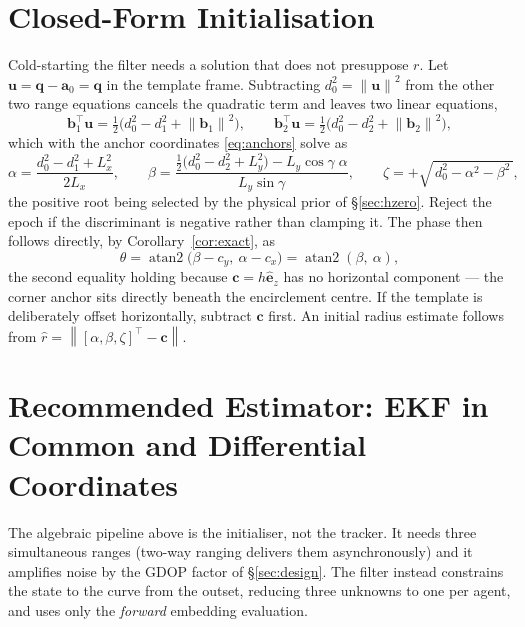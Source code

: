 \documentclass[11pt,a4paper]{article}
\newcommand{\ez}{\hat{\bm{e}}_z}
\newcommand{\q}{\bm{q}}
\newcommand{\av}{\bm{a}}
\newcommand{\bv}{\bm{b}}
\newcommand{\uv}{\bm{u}}
\newcommand{\cv}{\bm{c}}
\newcommand{\norm}[1]{\left\lVert#1\right\rVert}
\begin{document}
\section{Closed-Form Initialisation}
\label{sec:init}

Cold-starting the filter needs a solution that does not presuppose $r$. Let
$\uv = \q - \av_0 = \q$ in the template frame. Subtracting
$d_0^2 = \norm{\uv}^2$ from the other two range equations cancels the quadratic
term and leaves two linear equations,
\begin{equation}
\bv_1^\top\uv = \tfrac{1}{2}\big(d_0^2 - d_1^2 + \norm{\bv_1}^2\big),
\qquad
\bv_2^\top\uv = \tfrac{1}{2}\big(d_0^2 - d_2^2 + \norm{\bv_2}^2\big),
\end{equation}
which with the anchor coordinates \eqref{eq:anchors} solve as
\begin{equation}
\alpha = \frac{d_0^2 - d_1^2 + L_x^2}{2L_x},
\qquad
\beta = \frac{\tfrac{1}{2}\big(d_0^2-d_2^2+L_y^2\big) - L_y\cos\gamma\;\alpha}{L_y\sin\gamma},
\qquad
\zeta = +\sqrt{\,d_0^2 - \alpha^2 - \beta^2\,},
\label{eq:trilat}
\end{equation}
the positive root being selected by the physical prior of
\S\ref{sec:hzero}. Reject the epoch if the discriminant is negative rather than
clamping it. The phase then follows directly, by Corollary~\ref{cor:exact}, as
\begin{equation}
\theta = \operatorname{atan2}\big(\beta - c_y,\ \alpha - c_x\big)
       = \operatorname{atan2}(\beta,\ \alpha),
\end{equation}
the second equality holding because $\cv = h\ez$ has no horizontal component ---
the corner anchor sits directly beneath the encirclement centre. If the template
is deliberately offset horizontally, subtract $\cv$ first. An initial radius
estimate follows from $\hat r = \norm{[\alpha,\beta,\zeta]^\top - \cv}$.

\section{Recommended Estimator: EKF in Common and Differential Coordinates}
\label{sec:ekf}

The algebraic pipeline above is the initialiser, not the tracker. It needs three
simultaneous ranges (two-way ranging delivers them asynchronously) and it
amplifies noise by the GDOP factor of \S\ref{sec:design}. The filter instead
constrains the state to the curve from the outset, reducing three unknowns to
one per agent, and uses only the \emph{forward} embedding evaluation.
\end{document}

